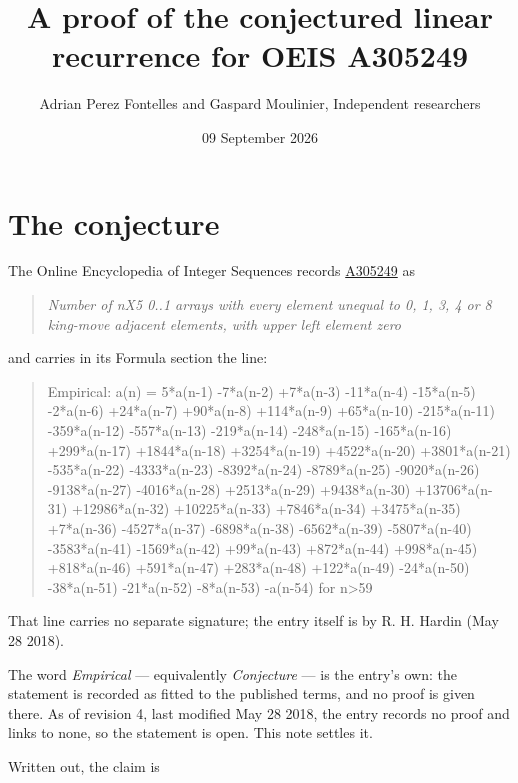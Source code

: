 \documentclass[11pt]{article}
\title{A proof of the conjectured linear recurrence for OEIS A305249}
\author{Adrian Perez Fontelles and Gaspard Moulinier, Independent researchers}
\date{09 September 2026}
\theoremstyle{definition}
\begin{document}
\maketitle
\section{The conjecture}

The Online Encyclopedia of Integer Sequences records \href{https://oeis.org/A305249}{A305249} as

\begin{quote}\itshape Number of nX5 0..1 arrays with every element unequal to 0, 1, 3, 4 or 8 king-move adjacent elements, with upper left element zero\end{quote}

and carries in its Formula section the line:

\begin{quote}\ttfamily Empirical: a(n) = 5*a(n-1) -7*a(n-2) +7*a(n-3) -11*a(n-4) -15*a(n-5) -2*a(n-6) +24*a(n-7) +90*a(n-8) +114*a(n-9) +65*a(n-10) -215*a(n-11) -359*a(n-12) -557*a(n-13) -219*a(n-14) -248*a(n-15) -165*a(n-16) +299*a(n-17) +1844*a(n-18) +3254*a(n-19) +4522*a(n-20) +3801*a(n-21) -535*a(n-22) -4333*a(n-23) -8392*a(n-24) -8789*a(n-25) -9020*a(n-26) -9138*a(n-27) -4016*a(n-28) +2513*a(n-29) +9438*a(n-30) +13706*a(n-31) +12986*a(n-32) +10225*a(n-33) +7846*a(n-34) +3475*a(n-35) +7*a(n-36) -4527*a(n-37) -6898*a(n-38) -6562*a(n-39) -5807*a(n-40) -3583*a(n-41) -1569*a(n-42) +99*a(n-43) +872*a(n-44) +998*a(n-45) +818*a(n-46) +591*a(n-47) +283*a(n-48) +122*a(n-49) -24*a(n-50) -38*a(n-51) -21*a(n-52) -8*a(n-53) -a(n-54) for n>59\end{quote}

That line carries no separate signature; the entry itself is by R. H. Hardin (May 28 2018).

The word {\itshape Empirical} --- equivalently {\itshape Conjecture} --- is the entry's own: the statement is recorded as fitted to the published terms, and no proof is given there. As of revision 4, last modified May 28 2018, the entry records no proof and links to none, so the statement is open. This note settles it.

Written out, the claim is
\end{document}
